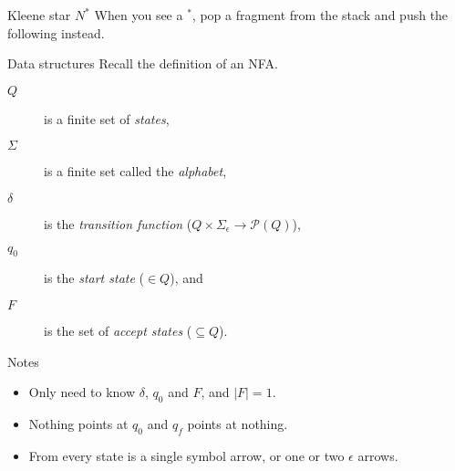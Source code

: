 \begin{frame}[fragile]{Kleene star $N^*$}
  When you see a $^*$, pop a fragment from the stack and push the following instead.
  
  \vspace{10mm}
  
  \begin{adjustbox}{max width={0.8\textwidth}, center}
  \end{adjustbox}
\end{frame}


\begin{frame}{Data structures}
  Recall the definition of an NFA.
  \begin{description}
    \item[$Q$] is a finite set of \emph{states},
    \item[$\Sigma$] is a finite set called the \emph{alphabet},
    \item[$\delta$] is the \emph{transition function} ($Q \times \Sigma_{\epsilon} \rightarrow \mathcal{P}(Q)$),
    \item[$q_0$] is the \emph{start state} ($\in Q$), and
    \item[$F$] is the set of \emph{accept states} ($\subseteq Q$). 
  \end{description}

  \begin{alertblock}{Notes}
    \begin{itemize}
      \item Only need to know $\delta$, $q_0$ and $F$, and $|F| = 1$.
      \item Nothing points at $q_0$ and $q_f$ points at nothing.
      \item From every state is a single symbol arrow, or one or two $\epsilon$ arrows.
    \end{itemize}
  \end{alertblock}
\end{frame}